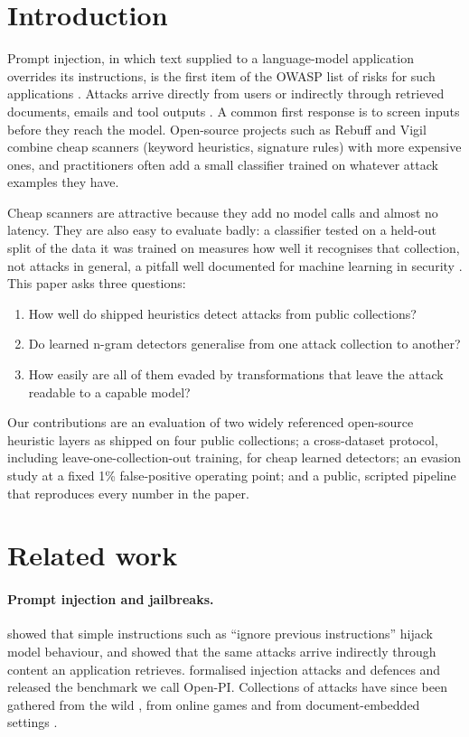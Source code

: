 \documentclass[preprint,12pt,authoryear]{elsarticle}
\begin{document}
\section{Introduction}
Prompt injection, in which text supplied to a language-model application overrides its instructions, is the first item of
the OWASP list of risks for such applications \citep{owasp2025llm}. Attacks arrive directly from users \citep{perez2022ignore}
or indirectly through retrieved documents, emails and tool outputs \citep{greshake2023indirect}. A common first response is to
screen inputs before they reach the model. Open-source projects such as Rebuff \citep{rebuff} and Vigil \citep{vigil} combine
cheap scanners (keyword heuristics, signature rules) with more expensive ones, and practitioners often add a small classifier
trained on whatever attack examples they have.

Cheap scanners are attractive because they add no model calls and almost no latency. They are also easy to evaluate badly: a
classifier tested on a held-out split of the data it was trained on measures how well it recognises that collection, not
attacks in general, a pitfall well documented for machine learning in security \citep{arp2022dos}. This paper asks three
questions:
\begin{enumerate}
\item How well do shipped heuristics detect attacks from public collections?
\item Do learned n-gram detectors generalise from one attack collection to another?
\item How easily are all of them evaded by transformations that leave the attack readable to a capable model?
\end{enumerate}

Our contributions are an evaluation of two widely referenced open-source heuristic layers as shipped on four public
collections; a cross-dataset protocol, including leave-one-collection-out training, for cheap learned detectors; an evasion
study at a fixed 1\% false-positive operating point; and a public, scripted pipeline that reproduces every number in the
paper.

\section{Related work}
\paragraph{Prompt injection and jailbreaks.} \citet{perez2022ignore} showed that simple instructions such as ``ignore previous
instructions'' hijack model behaviour, and \citet{greshake2023indirect} showed that the same attacks arrive indirectly through
content an application retrieves. \citet{liu2024formalizing} formalised injection attacks and defences and released the
benchmark we call Open-PI. Collections of attacks have since been gathered from the wild \citep{shen2024dan}, from online games
\citep{toyer2024tensortrust} and from document-embedded settings \citep{yi2023bipia}.
\end{document}
